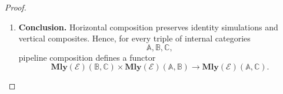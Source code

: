 \begin{proof}
\begin{enumerate}
        This is exactly the comparison component obtained by first taking the
        vertical composites and then horizontally composing them.

        \item \textbf{Conclusion.}
        Horizontal composition preserves identity simulations and vertical
        composites. Hence, for every triple of internal categories
        \[
            \mathbb A,\mathbb B,\mathbb C,
        \]
        pipeline composition defines a functor
        \[
            \mathbf{Mly}(\mathcal E)(\mathbb B,\mathbb C)
            \times
            \mathbf{Mly}(\mathcal E)(\mathbb A,\mathbb B)
            \longrightarrow
            \mathbf{Mly}(\mathcal E)(\mathbb A,\mathbb C).
        \]
    \end{enumerate}
\end{proof}

